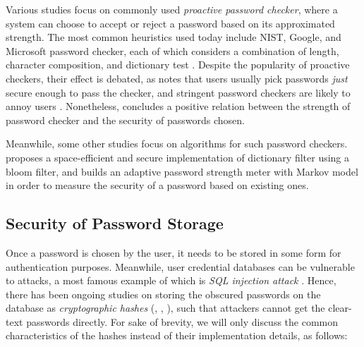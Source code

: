 \documentclass{article} %
\theoremstyle{definition}
\theoremstyle{theorem}
\theoremstyle{remark}
\theoremstyle{remark}
\begin{document}
\par\quad Various studies focus on commonly used \emph{proactive password checker}, where a system can choose to accept or reject a password based on its approximated strength. The most common heuristics used today include NIST, Google, and Microsoft password checker, each of which considers a combination of length, character composition, and dictionary test \cite{adaptive markov}. Despite the popularity of proactive checkers, their effect is debated, as \cite{empirical} notes that users usually pick passwords \emph{just} secure enough to pass the checker, and stringent password checkers are likely to annoy users \cite{addbang}. Nonetheless, \cite{measureup} concludes a positive relation between the strength of password checker and the security of passwords chosen.

\par\quad Meanwhile, some other studies focus on algorithms for such password checkers. \cite{easypass} proposes a space-efficient and secure implementation of dictionary filter using a bloom filter, and \cite{adaptive markov} builds an adaptive password strength meter with Markov model in order to measure the security of a password based on existing ones.

\subsection{Security of Password Storage}
\par\quad Once a password is chosen by the user, it needs to be stored in some form for authentication purposes. Meanwhile, user credential databases can be vulnerable to attacks, a most famous example of which is \emph{SQL injection attack} \cite{SQL injection}. Hence, there has been ongoing studies on storing the obscured passwords on the database as \emph{cryptographic hashes} (\cite{PKCS}, \cite{bcrypt}, \cite{scrypt}), such that attackers cannot get the clear-text passwords directly. For sake of brevity, we will only discuss the common characteristics of the hashes instead of their implementation details, as follows:
\end{document}
